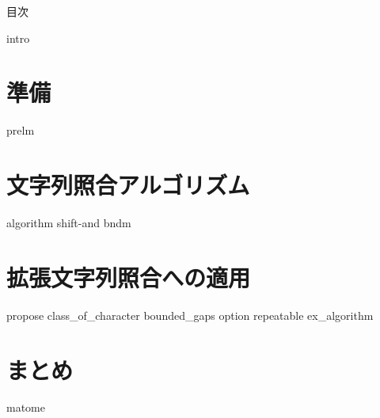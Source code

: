 \documentclass[12pt, dvipdfmx]{beamer}
\begin{document}
\maketitle
\begin{frame}{目次}
	\tableofcontents
\end{frame}

{intro}
\section{準備}
{prelm}
\section{文字列照合アルゴリズム}
{algorithm}
{shift-and}
{bndm}
\section{拡張文字列照合への適用}
{propose}
{class_of_character}
{bounded_gaps}
{option}
{repeatable}
{ex_algorithm}
\section{まとめ}
{matome}
\end{document}
